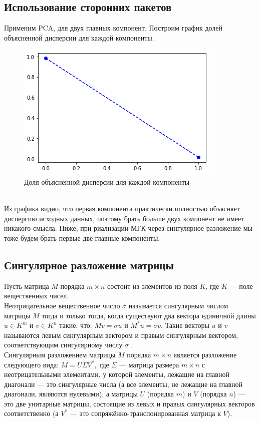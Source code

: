 \documentclass[a4]{article}
\begin{document}
	\subsection{Использование сторонних пакетов}
	Применим PCA, для двух главных компонент. Построим график долей объясненной дисперсии для каждой компоненты.
	\begin{figure}[h!]
		\includegraphics[width=\textwidth]{disp.png}\caption[Доля объясненной дисперсии для каждой компоненты]{Доля объясненной дисперсии для каждой компоненты}
	\end{figure}\\
	Из графика видно, что первая компонента практически полностью объясняет дисперсию исходных данных, поэтому брать больше двух компонент не имеет никакого смысла. Ниже, при риализации МГК через сингулярное разложение мы тоже будем брать первые две главные компоненты.
	\subsection{Сингулярное разложение матрицы}
	Пусть матрица $M$ порядка $m\times n$ состоит из элементов из поля $K$, где $K$ — поле вещественных чисел. \\
	Неотрицательное вещественное число $\sigma$  называется сингулярным числом матрицы $M$ тогда и только тогда, когда существуют два вектора единичной длины $u\in K^{m}$ и $v\in K^{n}$ такие, что:
	$ Mv=\sigma u$ и $M^{*}u=\sigma v$.
	Такие векторы $u$ и $v$ называются левым сингулярным вектором и правым сингулярным вектором, соответствующим сингулярному числу $\sigma$ .\\
	Сингулярным разложением матрицы $M$ порядка $m\times n$ является разложение следующего вида:
	$M=U\Sigma V^{*},$
	где $\Sigma$  — матрица размера $m\times n$ с неотрицательными элементами, у которой элементы, лежащие на главной диагонали — это сингулярные числа (а все элементы, не лежащие на главной диагонали, являются нулевыми), а матрицы $U$ (порядка $m$) и $V$ (порядка $n$) — это две унитарные матрицы, состоящие из левых и правых сингулярных векторов соответственно (а $V^*$ — это сопряжённо-транспонированная матрица к $V$).
\end{document}
